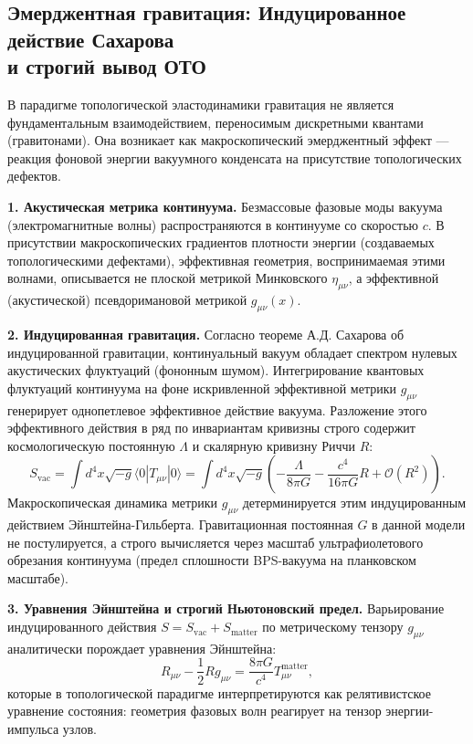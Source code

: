 \documentclass[11pt,a4paper]{article}
\begin{document}
	\subsection{Эмерджентная гравитация: Индуцированное действие Сахарова\\ и строгий вывод ОТО}
	В парадигме топологической эластодинамики гравитация не является фундаментальным взаимодействием, переносимым дискретными квантами (гравитонами). Она возникает как макроскопический эмерджентный эффект — реакция фоновой энергии вакуумного конденсата на присутствие топологических дефектов.
	
	\textbf{1. Акустическая метрика континуума.}
	Безмассовые фазовые моды вакуума (электромагнитные волны) распространяются в континууме со скоростью $c$. В присутствии макроскопических градиентов плотности энергии (создаваемых топологическими дефектами), эффективная геометрия, воспринимаемая этими волнами, описывается не плоской метрикой Минковского $\eta_{\mu\nu}$, а эффективной (акустической) псевдоримановой метрикой $g_{\mu\nu}(x)$. 
	
	\textbf{2. Индуцированная гравитация.}
	Согласно теореме А.Д. Сахарова об индуцированной гравитации, континуальный вакуум обладает спектром нулевых акустических флуктуаций (фононным шумом). Интегрирование квантовых флуктуаций континуума на фоне искривленной эффективной метрики $g_{\mu\nu}$ генерирует однопетлевое эффективное действие вакуума. 
	Разложение этого эффективного действия в ряд по инвариантам кривизны строго содержит космологическую постоянную $\Lambda$ и скалярную кривизну Риччи $R$:
	\begin{equation}
		S_{\text{vac}} = \int d^4x \sqrt{-g} \langle 0 | T_{\mu\nu} | 0 \rangle = \int d^4x \sqrt{-g} \left( - \frac{\Lambda}{8\pi G} - \frac{c^4}{16\pi G} R + \mathcal{O}(R^2) \right).
	\end{equation}
	Макроскопическая динамика метрики $g_{\mu\nu}$ детерминируется этим индуцированным действием Эйнштейна-Гильберта. Гравитационная постоянная $G$ в данной модели не постулируется, а строго вычисляется через масштаб ультрафиолетового обрезания континуума (предел сплошности BPS-вакуума на планковском масштабе).
	
	\textbf{3. Уравнения Эйнштейна и строгий Ньютоновский предел.}
	Варьирование индуцированного действия $S = S_{\text{vac}} + S_{\text{matter}}$ по метрическому тензору $g_{\mu\nu}$ аналитически порождает уравнения Эйнштейна:
	\begin{equation}
		R_{\mu\nu} - \frac{1}{2}R g_{\mu\nu} = \frac{8\pi G}{c^4} T_{\mu\nu}^{\text{matter}},
	\end{equation}
	которые в топологической парадигме интерпретируются как релятивистское уравнение состояния: геометрия фазовых волн реагирует на тензор энергии-импульса узлов.
	
\end{document}
